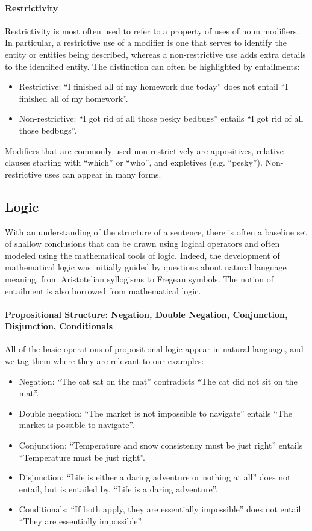 \documentclass{article} \usepackage{iclr2019_conference,times}
\begin{document}
\paragraph{Restrictivity} Restrictivity is most often used to refer to a property of uses of noun modifiers. In particular, a restrictive use of a modifier is one that serves to identify the entity or entities being described, whereas a non-restrictive use adds extra details to the identified entity. The distinction can often be highlighted by entailments:
\begin{itemize}
    \item Restrictive: ``I finished all of my homework due today'' does not entail ``I finished all of my homework''.
    \item Non-restrictive: ``I got rid of all those pesky bedbugs'' entails ``I got rid of all those bedbugs''.
\end{itemize}

Modifiers that are commonly used non-restrictively are appositives, relative clauses starting with ``which'' or ``who'', and expletives (e.g. ``pesky''). Non-restrictive uses can appear in many forms.

\subsection{Logic}

With an understanding of the structure of a sentence, there is often a baseline set of shallow conclusions that can be drawn using logical operators and often modeled using the mathematical tools of logic. Indeed, the development of mathematical logic was initially guided by questions about natural language meaning, from Aristotelian syllogisms to Fregean symbols. The notion of entailment is also borrowed from mathematical logic.

\paragraph{Propositional Structure: Negation, Double Negation, Conjunction, Disjunction, Conditionals}

All of the basic operations of propositional logic appear in natural language, and we tag them where they are relevant to our examples:
\begin{itemize}
    \item Negation: ``The cat sat on the mat'' contradicts ``The cat did not sit on the mat''.
    \item Double negation: ``The market is not impossible to navigate'' entails ``The market is possible to navigate''.
    \item Conjunction: ``Temperature and snow consistency must be just right'' entails ``Temperature must be just right''.
    \item Disjunction: ``Life is either a daring adventure or nothing at all'' does not entail, but is entailed by, ``Life is a daring adventure''.
    \item Conditionals: ``If both apply, they are essentially impossible'' does not entail ``They are essentially impossible''.
\end{itemize}
\end{document}
